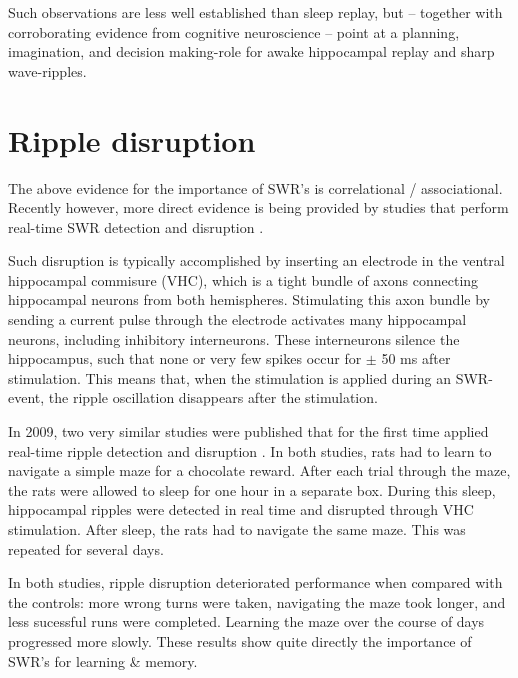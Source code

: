 Such observations are less well established than sleep replay, but -- together with corroborating evidence from cognitive neuroscience\footnotemark{} -- point at a planning, imagination, and decision making-role for awake hippocampal replay and sharp wave-ripples.





\section{Ripple disruption}
\label{sec:disruption}

The above evidence for the importance of SWR's is correlational / associational. Recently however, more direct evidence is being provided by studies that perform real-time SWR detection and disruption \cite{Ego-Stengel2009,Girardeau2009,Jadhav2012,Girardeau2014,Kovacs2016,Talakoub2016}.

Such disruption is typically accomplished by inserting an electrode in the ventral hippocampal commisure (VHC), which is a tight bundle of axons connecting hippocampal neurons from both hemispheres. Stimulating this axon bundle by sending a current pulse through the electrode activates many hippocampal neurons, including inhibitory interneurons. These interneurons silence the hippocampus, such that none or very few spikes occur for $\pm$ 50 ms after stimulation. This means that, when the stimulation is applied during an SWR-event, the ripple oscillation disappears after the stimulation.

In 2009, two very similar studies were published that for the first time applied real-time ripple detection and disruption \cite{Ego-Stengel2009,Girardeau2009}. In both studies, rats had to learn to navigate a simple maze for a chocolate reward. After each trial through the maze, the rats were allowed to sleep for one hour in a separate box. During this sleep, hippocampal ripples were detected in real time and disrupted through VHC stimulation. After sleep, the rats had to navigate the same maze. This was repeated for several days.

In both studies, ripple disruption deteriorated performance when compared with the controls:\footnotemark{} more wrong turns were taken, navigating the maze took longer, and less sucessful runs were completed. Learning the maze over the course of days progressed more slowly. These results show quite directly the importance of SWR's for learning \& memory.

